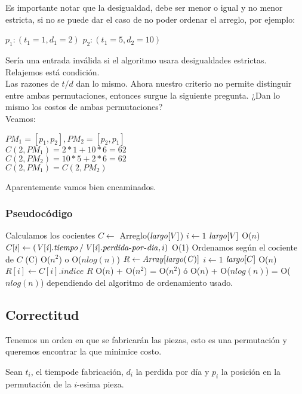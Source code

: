 \documentclass[11pt,a4paper]{article}
\newcommand{\bc}{\begin{center}}
\newcommand{\ec}{\end{center}}
\begin{document}
Es importante notar que la desigualdad, debe ser menor o igual y no menor estricta, si no se puede dar el caso de no poder ordenar el arreglo, por ejemplo:
\bc
$p_1 : (t_1 = 1, d_1 = 2)$
$p_2 : (t_1 = 5, d_2 = 10)$
\ec
Sería una entrada inválida si el algoritmo usara desigualdades estrictas. Relajemos está condición.\\
Las razones de $t / d$ dan lo mismo. Ahora nuestro criterio no permite distinguir entre ambas permutaciones, entonces surgue la siguiente pregunta. ¿Dan lo mismo los costos de ambas permutaciones?\\
Veamos:\\
\bc
$PM_1 = [p_1,p_2], PM_2 = [p_2, p_1]$\\
$C(2, PM_1) = 2*1 + 10*6 = 62 $\\
$C(2, PM_2) = 10*5 + 2*6 = 62 $\\ 
$C(2, PM_1) = C(2, PM_2)$
\ec
Aparentemente vamos bien encaminados.

\subsubsection{Pseudocódigo}

\begin{codebox}
\zi
  \Comment Calculamos los cocientes
\li $C \gets$ Arreglo($\id{largo}[V]$)
\li \For $i \gets 1$ \To $\id{largo}[V]$  \RComment O($n$)
\li   \Do
\li     $C[i] \gets (\id{V[i].tiempo} / \id{V[i].perdida-por-dia}, i) $  
     \End
     \RComment O(1)
\zi
  \Comment Ordenamos según el cociente de $C$
\li {}(C) \RComment O($n^2$) o O($nlog(n)$)
\li $R \gets  \id{Array[largo(C)]}$
\li \For $i \gets 1$ \To $\id{largo}[C]$ \RComment O($n$)
\li   \Do
\li     $R[i] \gets C[i].indice$
      \End
\li \Return $R$
\RComment O($n$) + O($n^2$) = O($n^2$) ó \zi
\RComment O($n$) + O($nlog(n)$) = O($nlog(n)$) \zi \RComment dependiendo del algoritmo de ordenamiento usado.
\end{codebox}

\subsection{Correctitud}

Tenemos un orden en que se fabricarán las piezas, esto es una permutación y queremos encontrar la que minimice costo.

Sean $t_i$, el tiempode fabricaci\'on, $d_i$ la perdida por día y $p_i$ la posición en la permutación de la $i$-esima pieza.
\end{document}
